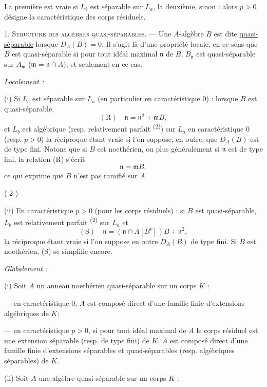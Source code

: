 La première est vraie si $L_b$ est séparable sur $L_a$, la deuxième, sinon : alors $p>0$ désigne la caractéristique des corps résiduels.

1. \textsc{Structure des algèbres quasi-séparables.} --- Une $A$-algèbre $B$ est dite \uline{quasi-séparable} lorsque $D_A(B)=0$. Il s'agit là d'une propriété locale, en ce sens que $B$ est quasi-séparable si pour tout idéal maximal $\mathfrak n$ de $B$, $B_{\mathfrak n}$ est quasi-séparable sur $A_{\mathfrak m}$ ($\mathfrak m=\mathfrak n\cap A$), et seulement en ce cas.

\textit{Localement :}

(i) Si $L_b$ est séparable sur $L_a$ (en particulier en caractéristique $0$) : lorsque $B$ est quasi-séparable,
\[
(\mathrm R)\quad \mathfrak n=\mathfrak n^2+\mathfrak mB,
\]
et $L_b$ est algébrique (resp. relativement parfait \textsuperscript{(2)}) sur $L_a$ en caractéristique $0$ (resp. $p>0$) la réciproque étant vraie si l'on suppose, en outre, que $D_A(B)$ est de type fini. Notons que si $B$ est noethérien, ou plus généralement si $\mathfrak n$ est de type fini, la relation (R) s'écrit
\[
\mathfrak n=\mathfrak mB,
\]
ce qui exprime que $B$ n'est pas ramifié sur $A$.


\begin{center}( 2 )\end{center}

(ii) En caractéristique $p>0$ (pour les corps résiduels) : si $B$ est quasi-séparable, $L_b$ est relativement parfait \textsuperscript{(2)} sur $L_a$ et
\[
(\mathrm S)\quad \mathfrak n=(\mathfrak n\cap A[B^p])B+\mathfrak n^2,
\]
la réciproque étant vraie si l'on suppose en outre $D_A(B)$ de type fini. Si $B$ est noethérien, (S) se simplifie encore.

\textit{Globalement :}

(i) Soit $A$ un anneau noethérien quasi-séparable sur un corps $K$ :

--- en caractéristique $0$, $A$ est composé direct d'une famille finie d'extensions algébriques de $K$;

--- en caractéristique $p>0$, si pour tout idéal maximal de $A$ le corps résiduel est une extension séparable (resp. de type fini) de $K$, $A$ est composé direct d'une famille finie d'extensions séparables et quasi-séparables (resp. algébriques séparables) de $K$.

(ii) Soit $A$ une algèbre quasi-séparable sur un corps $K$ :


